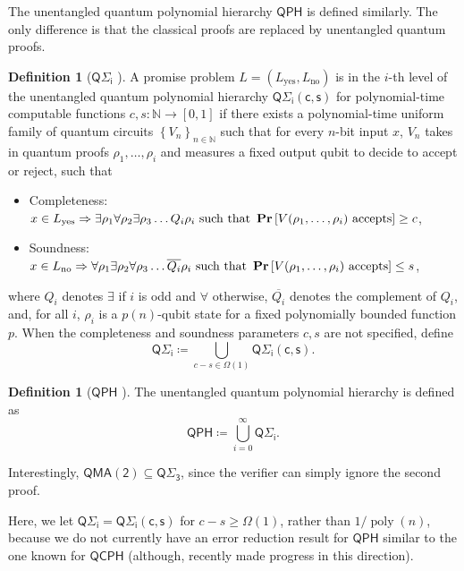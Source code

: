 \documentclass[11pt]{article}
\theoremstyle{definition}
\newtheorem{definition}[theorem]{Definition}
\renewcommand{\Pr}{\mathop{\bf Pr\/}}
\DeclareMathOperator{\poly}{poly}
\newcommand{\yes}{\text{yes}}
\newcommand{\no}{\text{no}}
\newcommand{\nats}{\mathbb N}
\newcommand{\N}{\nats}
\newcommand{\class}[1]{\ensuremath{\mathsf{#1}}\xspace}
\newcommand{\QMAk}[1][k]{\class{QMA(#1)}}
\newcommand{\QMAtwo}{\QMAk[2]}
\newcommand{\QCPH}{\class{QCPH}}
\newcommand{\QPH}{\class{QPH}}
\newcommand{\QSigmai}[1][i]{\class{Q\Sigma_{#1}}}
\begin{document}
The unentangled quantum polynomial hierarchy $\QPH$ is defined similarly. The only difference is that the classical proofs are replaced by unentangled quantum proofs. 

\begin{definition}[$\QSigmai$ {\cite{GSSSY22_qph}}] \label{def:prodqsigmai}
    A promise problem $L=(L_\yes, L_\no)$ is in the $i$-th level of the unentangled quantum polynomial hierarchy $\QSigmai[i]\class{(c,s)}$ for polynomial-time computable functions $c, s: \N \to [0,1]$ if there exists a polynomial-time uniform family of quantum circuits $\left\{V_n \right\}_{n \in \N}$ such that for every $n$-bit input $x$, $V_n$ takes in quantum proofs $\rho_1, \dots, \rho_i$ and measures a fixed output qubit to decide to accept or reject, such that
    \begin{itemize}
        \item Completeness: $ x \in L_\yes \Rightarrow  \exists \rho_1 \forall \rho_2 \exists \rho_3 \dots Q_i \rho_i \text{ such that } \Pr\left[ V(\rho_1, \dots, \rho_i) \text{ accepts}\right] \geq c $,
        \item Soundness: $ x\in L_\no \Rightarrow  \forall \rho_1 \exists \rho_2  \forall \rho_3 \dots \overline{Q_i} \rho_i  \text{ such that } \Pr\left[ V(\rho_{1},\dots, \rho_i) \text{ accepts}\right] \leq s $,
    \end{itemize}
   where $Q_i$ denotes $\exists$ if $i$ is odd and $\forall$ otherwise, $\overline{Q_i}$ denotes the complement of $Q_i$, and, for all $i$, $\rho_i$ is a $p(n)$-qubit state for a fixed polynomially bounded function $p$. 
   When the completeness and soundness parameters $c, s$ are not specified, define
    \[
        \QSigmai[i] \coloneqq \bigcup_{c-s \in \Omega(1)} \QSigmai[i]\class{(c,s)}.
    \]
\end{definition}
\begin{definition}[$\QPH$ {\cite{GSSSY22_qph}}]
The unentangled quantum polynomial hierarchy is defined as 
\[
\QPH \coloneqq \bigcup_{i=0}^\infty \QSigmai.
\]
\end{definition}

\noindent Interestingly, $\QMAtwo \subseteq \QSigmai[3]$, since the verifier can simply ignore the second proof. 

Here, we let $\QSigmai[i] = \QSigmai[i]\class{(c,s)}$ for $c-s \geq \Omega(1)$, rather than $1/\poly(n)$, because we do not currently have an error reduction result for $\QPH$ similar to the one known for $\QCPH$ (although, \cite{agarwal2023quantum} recently made progress in this direction). 
\end{document}
